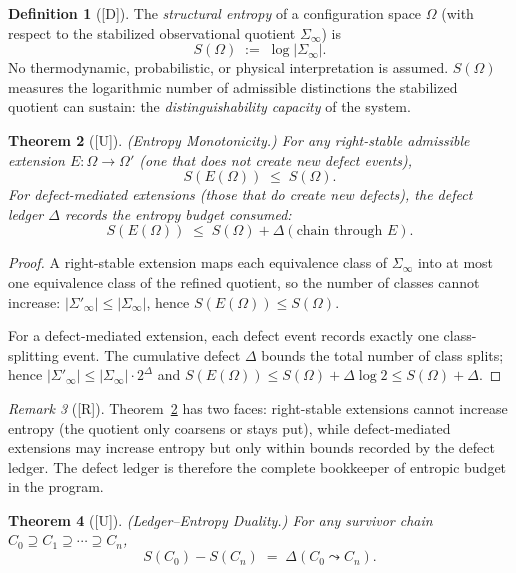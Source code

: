\documentclass[12pt,oneside]{amsbook}
\theoremstyle{plain}
\newtheorem{theorem}{Theorem}[section]
\theoremstyle{definition}
\newtheorem{definition}[theorem]{Definition}
\theoremstyle{remark}
\newtheorem{remark}[theorem]{Remark}
\newcommand{\status}[1]{\textup{[#1]}}
\begin{document}

\begin{definition}[\status{D}]\label{def:structural-entropy}
The \emph{structural entropy} of a configuration space $\Omega$ (with
respect to the stabilized observational quotient $\Sigma_\infty$) is
\[
  S(\Omega) \;:=\; \log|\Sigma_\infty|.
\]
No thermodynamic, probabilistic, or physical interpretation is assumed.
$S(\Omega)$ measures the logarithmic number of admissible distinctions
the stabilized quotient can sustain: the \emph{distinguishability
capacity} of the system.
\end{definition}

\begin{theorem}[\status{U}]\label{thm:entropy-monotone}
\textup{(Entropy Monotonicity.)}
For any right-stable admissible extension $E : \Omega \to \Omega'$
(one that does not create new defect events),
\[
  S(E(\Omega)) \;\leq\; S(\Omega).
\]
For defect-mediated extensions (those that do create new defects), the
defect ledger $\Delta$ records the entropy budget consumed:
\[
  S(E(\Omega)) \;\leq\; S(\Omega) + \Delta(\text{chain through } E).
\]
\end{theorem}

\begin{proof}
A right-stable extension maps each equivalence class of $\Sigma_\infty$
into at most one equivalence class of the refined quotient, so the
number of classes cannot increase: $|\Sigma'_\infty| \leq |\Sigma_\infty|$,
hence $S(E(\Omega)) \leq S(\Omega)$.

For a defect-mediated extension, each defect event records exactly one
class-splitting event.  The cumulative defect $\Delta$ bounds the
total number of class splits; hence
$|\Sigma'_\infty| \leq |\Sigma_\infty| \cdot 2^{\Delta}$
and $S(E(\Omega)) \leq S(\Omega) + \Delta \log 2 \leq S(\Omega) + \Delta$.
\end{proof}

\begin{remark}[\status{R}]
Theorem~\ref{thm:entropy-monotone} has two faces: right-stable
extensions cannot increase entropy (the quotient only coarsens or
stays put), while defect-mediated extensions may increase entropy but
only within bounds recorded by the defect ledger.  The defect ledger
is therefore the complete bookkeeper of entropic budget in the program.
\end{remark}

\begin{theorem}[\status{U}]\label{thm:ledger-entropy-duality}
\textup{(Ledger--Entropy Duality.)}
For any survivor chain $C_0 \supseteq C_1 \supseteq \cdots
\supseteq C_n$,
\[
  S(C_0) - S(C_n) \;=\; \Delta(C_0 \leadsto C_n).
\]
\end{theorem}
\end{document}
